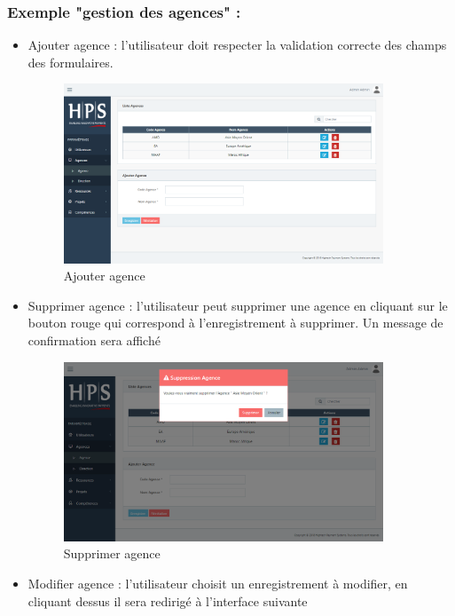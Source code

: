 \begin{itemize}[label=\textbullet]
	\subsubsection*{Exemple "gestion des agences" : }
	\begin{itemize}
			\item Ajouter agence :  l'utilisateur doit respecter la validation correcte des champs des formulaires.
			\begin{figure}[h!]  
			\centering
			\includegraphics[width=0.9\textwidth]{chapitre5/Figures/addagence.png}
			\caption{Ajouter agence}
			\end{figure}
			\item Supprimer agence : l'utilisateur peut supprimer une agence en cliquant sur le bouton rouge qui correspond à l'enregistrement à supprimer. Un message de confirmation sera affiché
			\begin{figure}[h!]  
			\centering
			\includegraphics[width=0.9\textwidth]{chapitre5/Figures/supagence.png}
			\caption{Supprimer agence}
			\end{figure}
\newpage
			\item Modifier agence : l'utilisateur choisit un enregistrement à modifier, en cliquant dessus il sera redirigé à l'interface suivante

\end{itemize}
\end{itemize}
